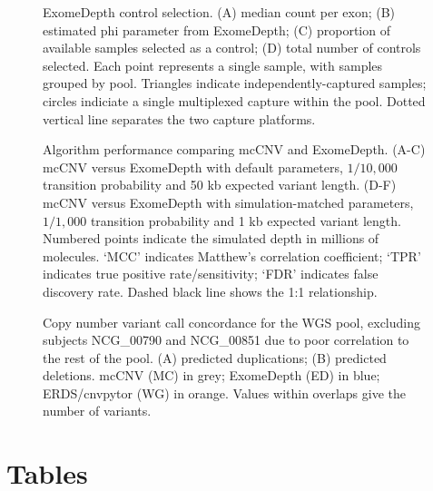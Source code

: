 \documentclass{bmcart}\usepackage[]{graphicx}\usepackage[]{color}
\begin{document}
\begin{backmatter}
\begin{figure}[h!]
  \centering
  \caption{ExomeDepth control selection. (A) median count per exon; (B) estimated phi parameter from ExomeDepth; (C) proportion of available samples selected as a control; (D) total number of controls selected. Each point represents a single sample, with samples grouped by pool. Triangles indicate independently-captured samples; circles indiciate a single multiplexed capture within the pool. Dotted vertical line separates the two capture platforms.}
  \label{fig:edSelection}
\end{figure}



\begin{figure}[h!]
  \centering
  \caption{Algorithm performance comparing mcCNV and ExomeDepth. (A-C) mcCNV versus ExomeDepth with default parameters, $1/10,000$ transition probability and 50 kb expected variant length. (D-F) mcCNV versus ExomeDepth with simulation-matched parameters, $1/1,000$ transition probability and 1 kb expected variant length. Numbered points indicate the simulated depth in millions of molecules. `MCC' indicates Matthew's correlation coefficient; `TPR' indicates true positive rate/sensitivity; `FDR' indicates false discovery rate. Dashed black line shows the 1:1 relationship.}
  \label{fig:simRes}
\end{figure}




\begin{figure}[h!]
  \centering
  \caption{Copy number variant call concordance for the WGS pool, excluding subjects NCG\_00790 and NCG\_00851 due to poor correlation to the rest of the pool. (A) predicted duplications; (B) predicted deletions. mcCNV (MC) in grey; ExomeDepth (ED) in blue; ERDS/cnvpytor (WG) in orange. Values within overlaps give the number of variants.}
  \label{fig:wgsVenn}
\end{figure}

\section*{Tables}


\end{backmatter}
\end{document}

